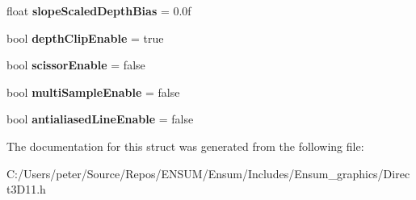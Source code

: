 \begin{DoxyCompactItemize}
\item 
float {\bfseries slope\+Scaled\+Depth\+Bias} = 0.\+0f\hypertarget{struct_ensum_1_1_graphics_1_1_rasterizer_state_ac4d7231b258bd51fc0fcdd5630cf4f18}{}\label{struct_ensum_1_1_graphics_1_1_rasterizer_state_ac4d7231b258bd51fc0fcdd5630cf4f18}

\item 
bool {\bfseries depth\+Clip\+Enable} = true\hypertarget{struct_ensum_1_1_graphics_1_1_rasterizer_state_a15a556ba8cfeff48b1d3aca4b956348a}{}\label{struct_ensum_1_1_graphics_1_1_rasterizer_state_a15a556ba8cfeff48b1d3aca4b956348a}

\item 
bool {\bfseries scissor\+Enable} = false\hypertarget{struct_ensum_1_1_graphics_1_1_rasterizer_state_a082afb9e60ba598f4416cdff9ab9475b}{}\label{struct_ensum_1_1_graphics_1_1_rasterizer_state_a082afb9e60ba598f4416cdff9ab9475b}

\item 
bool {\bfseries multi\+Sample\+Enable} = false\hypertarget{struct_ensum_1_1_graphics_1_1_rasterizer_state_ae538f865953bea7ef9fbde74dd686807}{}\label{struct_ensum_1_1_graphics_1_1_rasterizer_state_ae538f865953bea7ef9fbde74dd686807}

\item 
bool {\bfseries antialiased\+Line\+Enable} = false\hypertarget{struct_ensum_1_1_graphics_1_1_rasterizer_state_a22219a6c61777df7983ad4a4eb4b7381}{}\label{struct_ensum_1_1_graphics_1_1_rasterizer_state_a22219a6c61777df7983ad4a4eb4b7381}

\end{DoxyCompactItemize}


The documentation for this struct was generated from the following file\+:\begin{DoxyCompactItemize}
\item 
C\+:/\+Users/peter/\+Source/\+Repos/\+E\+N\+S\+U\+M/\+Ensum/\+Includes/\+Ensum\+\_\+graphics/Direct3\+D11.\+h\end{DoxyCompactItemize}
